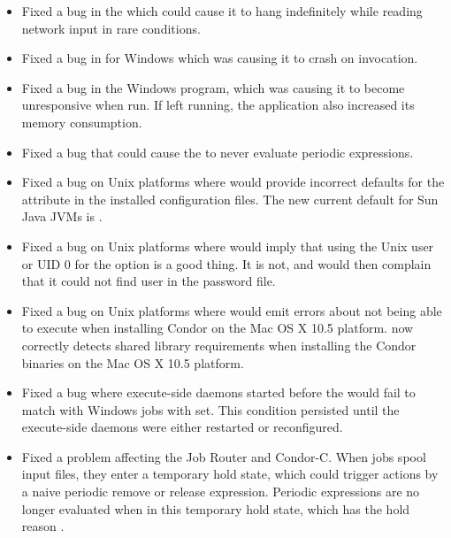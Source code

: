 \begin{itemize}

\item Fixed a bug in the  which could cause it
to hang indefinitely while reading network input in rare conditions.

\item Fixed a bug in  for Windows which was causing it
to crash on invocation.

\item Fixed a bug in the Windows  program, which was causing
it to become unresponsive when run.  If left running, the application also
increased its memory consumption.

\item Fixed a bug that could cause the  to never
evaluate periodic expressions.

\item Fixed a bug on Unix platforms where  would
provide incorrect defaults for the 
attribute in the installed configuration files. The new current
default for Sun Java JVMs is .

\item Fixed a bug on Unix platforms where  would
imply that using the Unix user  or UID 0 for the
 option is a good thing.  It is not, and would then complain
that it could not find user  in the password file.

\item Fixed a bug on Unix platforms where  would
emit errors about not being able to execute  when installing
Condor on the Mac OS X 10.5 platform.   now
correctly detects shared library requirements when installing the
Condor binaries on the Mac OS X 10.5 platform.

\item Fixed a bug where execute-side daemons started before the
 would fail to match with Windows jobs with
 set.  This condition persisted until the
execute-side daemons were either restarted or reconfigured.

\item Fixed a problem affecting the Job Router and Condor-C.  When jobs
spool input files, they enter a temporary hold state, which could
trigger actions by a naive periodic remove or release expression.
Periodic expressions are no longer evaluated when in this temporary
hold state, which has the hold reason .


\end{itemize}
